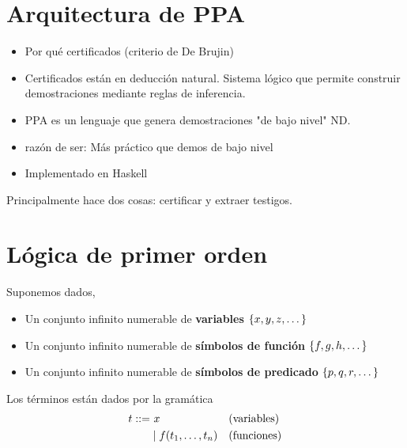 \section{Arquitectura de PPA}

\begin{itemize}
    \item Por qué certificados (criterio de De Brujin)
    \item Certificados están en deducción natural. Sistema lógico que permite
    construir demostraciones mediante reglas de inferencia.
    \item PPA es un lenguaje que genera demostraciones "de bajo nivel" ND.
    \item razón de ser: Más práctico que demos de bajo nivel
    \item Implementado en Haskell
\end{itemize}

Principalmente hace dos cosas: certificar y extraer testigos.

\section{Lógica de primer orden}

Suponemos dados,

\begin{itemize}
    \item Un conjunto infinito numerable de \textbf{variables}
    \(
        \{x, y, z, \dots\}
    \)
    \item Un conjunto infinito numerable de \textbf{símbolos de función}
    \(
        \{f, g, h, \dots\}
    \)
    \item Un conjunto infinito numerable de \textbf{símbolos de predicado}
    \(
        \{p, q, r, \dots\}
    \)
\end{itemize}

\begin{definition}[Términos]
    Los términos están dados por la gramática
    \begin{alignat*}{2}
        t ::=&\ x
        &&\text{(variables)}\\
        &\mid f(t_1, \dots, t_n)    
        &&\text{(funciones)}
    \end{alignat*}
\end{definition}

